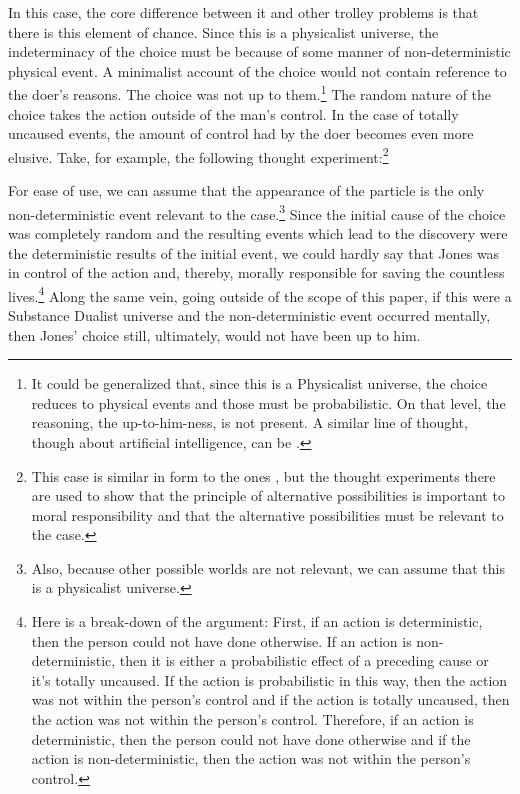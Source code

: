 In this case, the core difference between it and other trolley problems is that there is this element of chance. Since this is a physicalist universe, the indeterminacy of the choice must be because of some manner of non-deterministic physical event. A minimalist account of the choice would not contain reference to the doer’s reasons. The choice was not up to them.\footnote{It could be generalized that, since this is a Physicalist universe, the choice reduces to physical events and those must be probabilistic. On that level, the reasoning, the up-to-him-ness, is not present. A similar line of thought, though about artificial intelligence, can be \cite[found in][ ]{Searle1}.} The random nature of the choice takes the action outside of the man’s control. In the case of totally uncaused events, the amount of control had by the doer becomes even more elusive. Take, for example, the following thought experiment:\footnote{This case is similar in form to the ones \cite[seen in][ ]{Elzein1}, but the thought experiments there are used to show that the principle of alternative possibilities is important to moral responsibility and that the alternative possibilities must be relevant to the case.}

For ease of use, we can assume that the appearance of the particle is the only non-deterministic event relevant to the case.\footnote{Also, because other possible worlds are not relevant, we can assume that this is a physicalist universe.} Since the initial cause of the choice was completely random and the resulting events which lead to the discovery were the deterministic results of the initial event, we could hardly say that Jones was in control of the action and, thereby, morally responsible for saving the countless lives.\footnote{Here is a break-down of the argument: First, if an action is deterministic, then the person could not have done otherwise. If an action is non-deterministic, then it is either a probabilistic effect of a preceding cause or it’s totally uncaused. If the action is probabilistic in this way, then the action was not within the person’s control and if the action is totally uncaused, then the action was not within the person’s control. Therefore, if an action is deterministic, then the person could not have done otherwise and if the action is non-deterministic, then the action was not within the person’s control.} Along the same vein, going outside of the scope of this paper, if this were a Substance Dualist universe and the non-deterministic event occurred mentally, then Jones’ choice still, ultimately, would not have been up to him.
